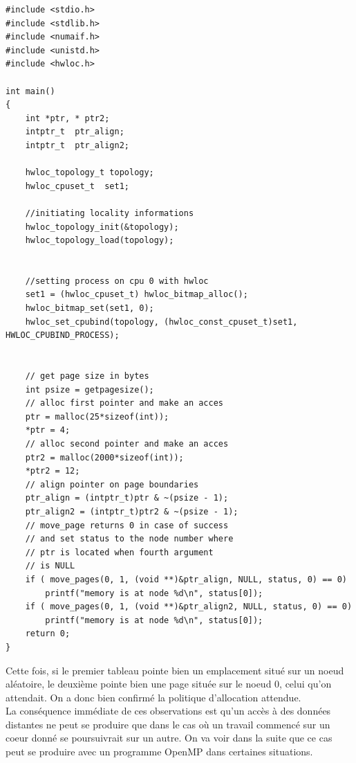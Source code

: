 \documentclass{report}
\begin{document}
\begin{lstlisting}
#include <stdio.h>
#include <stdlib.h>
#include <numaif.h>
#include <unistd.h>
#include <hwloc.h>

int main()
{
	int *ptr, * ptr2;
	intptr_t  ptr_align;
	intptr_t  ptr_align2;

	hwloc_topology_t topology;
	hwloc_cpuset_t  set1;

	//initiating locality informations
	hwloc_topology_init(&topology);
	hwloc_topology_load(topology);
	
	
	//setting process on cpu 0 with hwloc
	set1 = (hwloc_cpuset_t) hwloc_bitmap_alloc();
	hwloc_bitmap_set(set1, 0);
	hwloc_set_cpubind(topology, (hwloc_const_cpuset_t)set1, HWLOC_CPUBIND_PROCESS);


	// get page size in bytes
	int psize = getpagesize();
	// alloc first pointer and make an acces
	ptr = malloc(25*sizeof(int));
	*ptr = 4;
	// alloc second pointer and make an acces
	ptr2 = malloc(2000*sizeof(int));
	*ptr2 = 12;
	// align pointer on page boundaries
	ptr_align = (intptr_t)ptr & ~(psize - 1);
	ptr_align2 = (intptr_t)ptr2 & ~(psize - 1);
	// move_page returns 0 in case of success
	// and set status to the node number where 
	// ptr is located when fourth argument
	// is NULL
	if ( move_pages(0, 1, (void **)&ptr_align, NULL, status, 0) == 0)
		printf("memory is at node %d\n", status[0]);
	if ( move_pages(0, 1, (void **)&ptr_align2, NULL, status, 0) == 0)
		printf("memory is at node %d\n", status[0]);
	return 0;
}

\end{lstlisting}

Cette fois, si le premier tableau pointe bien un emplacement situé sur un noeud aléatoire,
le deuxième pointe bien une page située sur le noeud 0, celui qu'on attendait. On a donc
bien confirmé la politique d'allocation attendue.
\\La conséquence immédiate de ces observations est qu'un accès à des données distantes ne peut
se produire que dans le cas où un travail commencé sur un coeur donné se poursuivrait sur un autre.
On va voir dans la suite que ce cas peut se produire avec un programme OpenMP dans certaines
situations.
\end{document}
